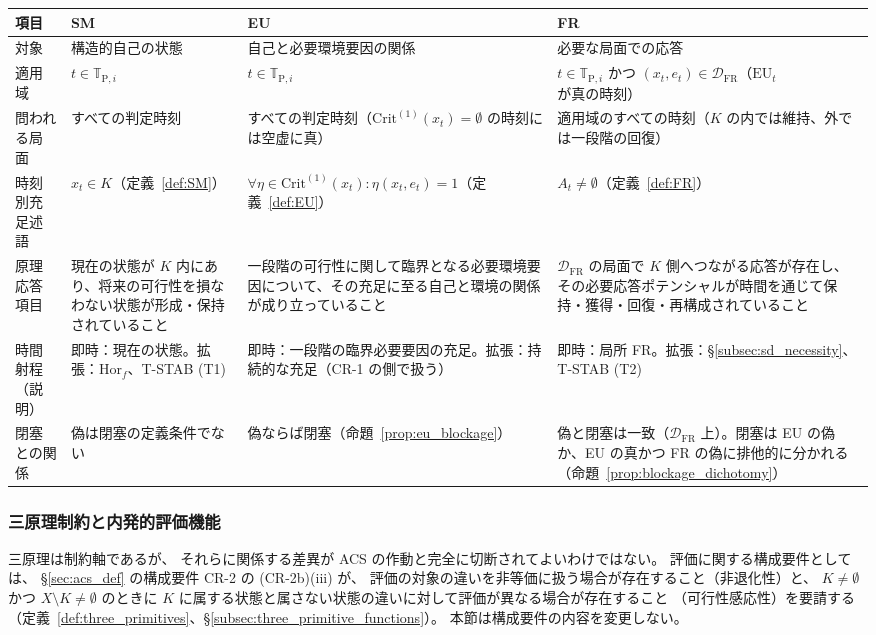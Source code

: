 \begin{center}
\begingroup\small\setlength{\tabcolsep}{4pt}\renewcommand{\arraystretch}{1.18}
\begin{tabular}{p{2.6cm} p{3.9cm} p{3.9cm} p{3.9cm}}
\hline
\textbf{項目} & \textbf{SM} & \textbf{EU} & \textbf{FR} \\
\hline
対象 & 構造的自己の状態 & 自己と必要環境要因の関係 & 必要な局面での応答 \\[3pt]
適用域 & $t\in\mathbb{T}_{\mathrm{P},i}$ & $t\in\mathbb{T}_{\mathrm{P},i}$ & $t\in\mathbb{T}_{\mathrm{P},i}$ かつ $(x_t,e_t)\in\mathcal{D}_{\mathrm{FR}}$（$\mathrm{EU}_t$ が真の時刻） \\[3pt]
問われる局面 & すべての判定時刻 & すべての判定時刻（$\mathrm{Crit}^{(1)}(x_t)=\emptyset$ の時刻には空虚に真） & 適用域のすべての時刻（$K$ の内では維持、外では一段階の回復） \\[3pt]
時刻別充足述語 & $x_t\in K$（定義~\ref{def:SM}） & $\forall\eta\in\mathrm{Crit}^{(1)}(x_t):\eta(x_t,e_t)=1$（定義~\ref{def:EU}） & $A_t\neq\emptyset$（定義~\ref{def:FR}） \\[3pt]
原理応答項目 & 現在の状態が $K$ 内にあり、将来の可行性を損なわない状態が形成・保持されていること & 一段階の可行性に関して臨界となる必要環境要因について、その充足に至る自己と環境の関係が成り立っていること & $\mathcal{D}_{\mathrm{FR}}$ の局面で $K$ 側へつながる応答が存在し、その必要応答ポテンシャルが時間を通じて保持・獲得・回復・再構成されていること \\[3pt]
時間射程（説明） & 即時：現在の状態。拡張：$\mathrm{Hor}_f$、T-STAB (T1) & 即時：一段階の臨界必要要因の充足。拡張：持続的な充足（CR-1 の側で扱う） & 即時：局所 FR。拡張：\S\ref{subsec:sd_necessity}、T-STAB (T2) \\[3pt]
閉塞との関係 & 偽は閉塞の定義条件でない & 偽ならば閉塞（命題~\ref{prop:eu_blockage}） & 偽と閉塞は一致（$\mathcal{D}_{\mathrm{FR}}$ 上）。閉塞は EU の偽か、EU の真かつ FR の偽に排他的に分かれる（命題~\ref{prop:blockage_dichotomy}） \\
\hline
\end{tabular}
\endgroup
\end{center}

\subsubsection{三原理制約と内発的評価機能}

三原理は制約軸であるが、
それらに関係する差異が ACS の作動と完全に切断されてよいわけではない。
評価に関する構成要件としては、
\S\ref{sec:acs_def} の構成要件 CR-2 の (CR-2b)(iii) が、
評価の対象の違いを非等価に扱う場合が存在すること（非退化性）と、
$K\neq\emptyset$ かつ $X\setminus K\neq\emptyset$ のときに
$K$ に属する状態と属さない状態の違いに対して評価が異なる場合が存在すること
（可行性感応性）を要請する
（定義~\ref{def:three_primitives}、\S\ref{subsec:three_primitive_functions}）。
本節は構成要件の内容を変更しない。

